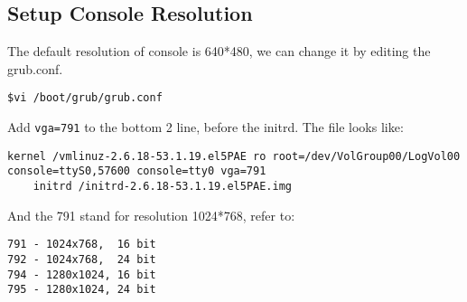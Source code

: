 \subsection{Setup Console Resolution}
The default resolution of console is 640*480, we can change it by editing the grub.conf.
\begin{lstlisting}
$vi /boot/grub/grub.conf
\end{lstlisting}
Add \verb/vga=791/ to the bottom 2 line, before the initrd. The file looks like:
\begin{lstlisting}
kernel /vmlinuz-2.6.18-53.1.19.el5PAE ro root=/dev/VolGroup00/LogVol00 console=ttyS0,57600 console=tty0 vga=791
    initrd /initrd-2.6.18-53.1.19.el5PAE.img
\end{lstlisting}
And the 791 stand for resolution 1024*768, refer to:
\begin{lstlisting}
791 - 1024x768,  16 bit
792 - 1024x768,  24 bit
794 - 1280x1024, 16 bit
795 - 1280x1024, 24 bit
\end{lstlisting}

